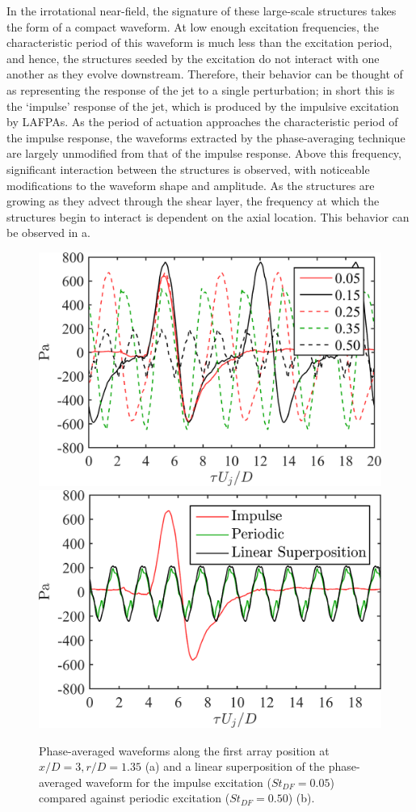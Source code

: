 In the irrotational near-field, the signature of these large-scale structures takes the form of a compact waveform. 
At low enough excitation frequencies, the characteristic period of this waveform is much less than the excitation period, and hence, the structures seeded by the excitation do not interact with one another as they evolve downstream. 
Therefore, their behavior can be thought of as representing the response of the jet to a single perturbation; in short this is the `impulse' response of the jet, which is produced by the impulsive excitation by LAFPAs.
As the period of actuation approaches the characteristic period of the impulse response, the waveforms extracted by the phase-averaging technique are largely unmodified from that of the impulse response. 
Above this frequency, significant interaction between the structures is observed, with noticeable modifications to the waveform shape and amplitude. 
As the structures are growing as they advect through the shear layer, the frequency at which the structures begin to interact is dependent on the axial location.
This behavior can be observed in a.
\begin{figure}
	\centering
		\includegraphics[width=0.45\linewidth]{Figures/ch3_nearfield_phavg_v2.png}
		\includegraphics[width=0.45\linewidth]{Figures/ch3_nearfield_linear_v2.png}
	\caption{Phase-averaged waveforms along the first array position at $x/D = 3, r/D = 1.35$ (a) and a linear superposition of the phase-averaged waveform for the impulse excitation ($St_{DF} = 0.05$) compared against periodic excitation ($St_{DF} = 0.50$) (b).}
	\label{fig:ch3_nearfield}
\end{figure}

